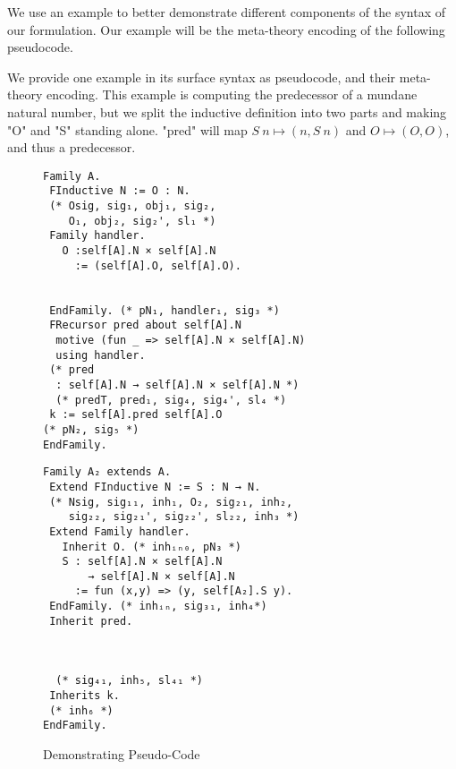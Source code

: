 We use an example to better demonstrate different components of the
syntax of our formulation. Our example will be the meta-theory encoding
of the following pseudocode.

We provide one example in its surface syntax as pseudocode, and their
meta-theory encoding. This example is computing the predecessor of a
mundane natural number, but we split the inductive definition into two
parts and making "O" and "S" standing alone.
"pred" will map $S~n \mapsto (n, S~n)$ and $O \mapsto (O, O)$, and thus a predecessor.




\begin{figure}[H]\label{fig:example-pseudocode}
\begin{minipage}[t]{0.5\linewidth}
\begin{verbatim}
Family A.
 FInductive N := O : N. 
 (* Osig, sig₁, obj₁, sig₂,
    O₁, obj₂, sig₂', sl₁ *)
 Family handler.
   O :self[A].N × self[A].N 
     := (self[A].O, self[A].O). 


 EndFamily. (* pN₁, handler₁, sig₃ *)
 FRecursor pred about self[A].N 
  motive (fun _ => self[A].N × self[A].N)
  using handler.
 (* pred
  : self[A].N → self[A].N × self[A].N *)
  (* predT, pred₁, sig₄, sig₄', sl₄ *) 
 k := self[A].pred self[A].O 
(* pN₂, sig₅ *)
EndFamily.
\end{verbatim}
  \end{minipage}
  \begin{minipage}[t]{0.45\linewidth}
\begin{verbatim}
Family A₂ extends A.
 Extend FInductive N := S : N → N.
 (* Nsig, sig₁₁, inh₁, O₂, sig₂₁, inh₂, 
    sig₂₂, sig₂₁', sig₂₂', sl₂₂, inh₃ *)
 Extend Family handler.
   Inherit O. (* inhᵢₙ₀, pN₃ *)
   S : self[A].N × self[A].N
       → self[A].N × self[A].N 
     := fun (x,y) => (y, self[A₂].S y).
 EndFamily. (* inhᵢₙ, sig₃₁, inh₄*)
 Inherit pred.
 


  (* sig₄₁, inh₅, sl₄₁ *)
 Inherits k. 
 (* inh₆ *)
EndFamily.
    \end{verbatim}
  \end{minipage}
  \caption{Demonstrating Pseudo-Code}
\end{figure}

